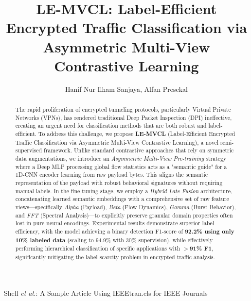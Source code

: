 \documentclass[lettersize,journal]{IEEEtran}
\begin{document}
\title{LE-MVCL: Label-Efficient Encrypted Traffic Classification via Asymmetric Multi-View Contrastive Learning}

\author{Hanif Nur Ilham Sanjaya, Alfan Presekal}

%
{Shell \MakeLowercase{\textit{et al.}}: A Sample Article Using IEEEtran.cls for IEEE Journals}


\maketitle

\begin{abstract}
The rapid proliferation of encrypted tunneling protocols, particularly Virtual Private Networks (VPNs), has rendered traditional Deep Packet Inspection (DPI) ineffective, creating an urgent need for classification methods that are both robust and label-efficient. To address this challenge, we propose \textbf{LE-MVCL} (Label-Efficient Encrypted Traffic Classification via Asymmetric Multi-View Contrastive Learning), a novel semi-supervised framework. Unlike standard contrastive approaches that rely on symmetric data augmentations, we introduce an \textit{Asymmetric Multi-View Pre-training} strategy where a Deep MLP processing global flow statistics acts as a "semantic guide" for a 1D-CNN encoder learning from raw payload bytes. This aligns the semantic representation of the payload with robust behavioral signatures without requiring manual labels. In the fine-tuning stage, we employ a \textit{Hybrid Late-Fusion} architecture, concatenating learned semantic embeddings with a comprehensive set of raw feature views—specifically \textit{Alpha} (Payload), \textit{Beta} (Flow Dynamics), \textit{Gamma} (Burst Behavior), and \textit{FFT} (Spectral Analysis)—to explicitly preserve granular domain properties often lost in pure neural encodings. Experimental results demonstrate superior label efficiency, with the model achieving a binary detection F1-score of \textbf{92.2\% using only 10\% labeled data} (scaling to 94.9\% with 30\% supervision), while effectively performing hierarchical classification of specific applications with \textbf{$>$91\% F1}, significantly mitigating the label scarcity problem in encrypted traffic analysis.
\end{abstract}
\end{document}
